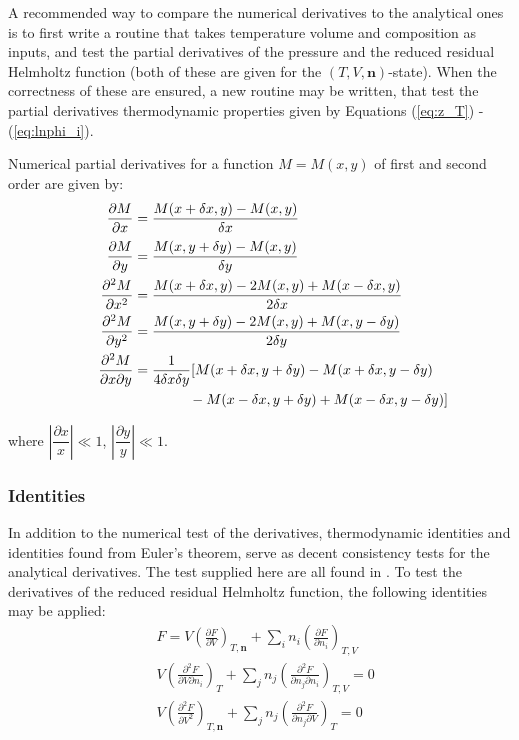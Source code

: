 \documentclass[english]{../thermomemo/thermomemo}
\numberwithin{equation}{section}
\newcommand*{\pd}[2]{\frac{\partial #1}{\partial #2}}
\newcommand*{\pdd}[2]{\frac{\partial^2 #1}{\partial #2^2}}
\newcommand*{\pder}[2]{\left(\frac{\partial #1}{\partial #2}\right)}
\newcommand*{\pdder}[2]{\left(\frac{\partial^2 #1}{\partial #2^2}\right)}
\newcommand*{\pdcross}[3]{\left(\frac{\partial^2 #1}{\partial #2 \partial #3}\right)}
\newcommand*{\reff}[1]{(\ref{#1})}
\begin{document}
A recommended way to compare the numerical derivatives to the analytical ones is to first write a routine that takes temperature volume and composition as inputs, and test the partial derivatives of the pressure and the reduced residual Helmholtz function (both of these are given for the $(T,V,\textbf{n})$-state). When the correctness of these are ensured, a new routine may be written, that test the partial derivatives thermodynamic properties given by Equations \reff{eq:z_T} - \reff{eq:lnphi_i}.

Numerical partial derivatives for a function $M = M(x,y)$ of first and second order are given by:
\begin{align}
  \phantom{\frac{\partial^2 M}{\partial x \partial y}}
    \label{eq:numDir1}
	\pd{M}{x} & = \frac{M(x + \delta x,y) - M(x ,y)}{\delta x } \\
	\pd{M}{y} & = \frac{M(x ,y+ \delta y) - M(x ,y)}{\delta y } \\
	\pdd{M}{x} & = \frac{M(x + \delta x,y) - 2 M(x ,y) + M(x - \delta x,y)}{2 \delta x} \\
	\pdd{M}{y} & = \frac{M(x ,y+ \delta y) - 2 M(x ,y) + M(x ,y- \delta y)}{2 \delta y} \\
  & \begin{aligned}
    \label{eq:numDir5}
    \mathllap{\frac{\partial^2 M}{\partial x \partial y}}
	 & = \frac{1}{4 \delta x \delta y} [M(x + \delta x,y + \delta y)- M(x + \delta x,y - \delta y) \\
	 & \qquad \qquad - M(x - \delta x,y + \delta y) + M(x - \delta x,y - \delta y) ]
  \end{aligned}
\end{align}

where $\left| \dfrac{\partial x}{x} \right| \ll 1$,  $\left|\dfrac{\partial y}{y} \right| \ll 1$.
 
\subsubsection*{Identities}  
In addition to the numerical test of the derivatives, thermodynamic identities and identities found from Euler's theorem, serve as decent consistency tests for the analytical derivatives. The test supplied here are all found in \cite{MM}. To test the derivatives of the reduced residual Helmholtz function, the following identities may be applied:
\begin{align}
\label{test:1}
& F = V \pder{F}{V}_{T,\textbf{n}} + \sum_i n_i \pder{F}{n_i}_{T,V} \\
\label{test:2}
& V \pdcross{F}{V}{n_i}_T + \sum_j n_j \pdcross{F}{n_j}{n_i}_{T,V} = 0 \\
\label{test:3}
& V \pdder{F}{V}_{T,\textbf{n}} + \sum_j n_j \pdcross{F}{n_j}{V}_T = 0
\end{align}
\end{document}
